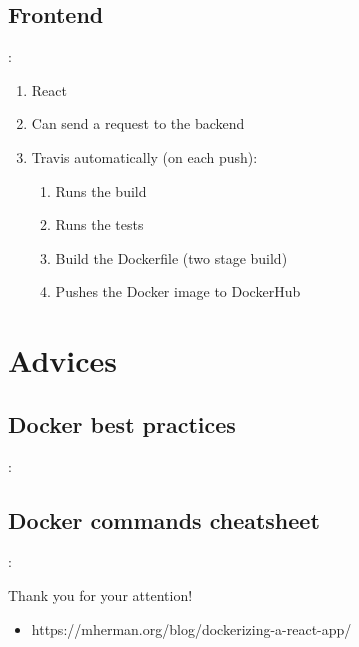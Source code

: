 \documentclass{beamer}
\begin{document}
\subsection{Frontend}
\begin{frame}{\secname : \subsecname}

\begin{enumerate}
    \item React
    \item Can send a request to the backend
    \item Travis automatically (on each push):
    \begin{enumerate}
        \item Runs the build
        \item Runs the tests
        \item Build the Dockerfile (two stage build)
        \item Pushes the Docker image to DockerHub
    \end{enumerate}
\end{enumerate}

\end{frame}

\section{Advices}

\subsection{Docker best practices}
\begin{frame}{\secname : \subsecname}
\end{frame}

\subsection{Docker commands cheatsheet}
\begin{frame}{\secname : \subsecname}
\end{frame}


\begin{frame}
\centering
{\Huge Thank you for your attention!}
\end{frame}

\begin{footnotesize}
    \begin{itemize}
        \item https://mherman.org/blog/dockerizing-a-react-app/
    \end{itemize}
\end{footnotesize}
\end{document}
